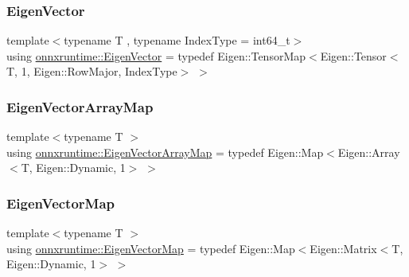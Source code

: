 \subsubsection{\texorpdfstring{Eigen\+Vector}{EigenVector}}
{\footnotesize\ttfamily template$<$typename T , typename Index\+Type  = int64\+\_\+t$>$ \\
using \mbox{\hyperlink{namespaceonnxruntime_a0f5d0e96b27a203da5065e22dfa6f28e}{onnxruntime\+::\+Eigen\+Vector}} = typedef Eigen\+::\+Tensor\+Map$<$Eigen\+::\+Tensor$<$T, 1, Eigen\+::\+Row\+Major, Index\+Type$>$ $>$}

\mbox{\label{namespaceonnxruntime_a6a153146e7fb11392789d4e7fbdfaac4}} 
\subsubsection{\texorpdfstring{Eigen\+Vector\+Array\+Map}{EigenVectorArrayMap}}
{\footnotesize\ttfamily template$<$typename T $>$ \\
using \mbox{\hyperlink{namespaceonnxruntime_a6a153146e7fb11392789d4e7fbdfaac4}{onnxruntime\+::\+Eigen\+Vector\+Array\+Map}} = typedef Eigen\+::\+Map$<$Eigen\+::\+Array$<$T, Eigen\+::\+Dynamic, 1$>$ $>$}

\mbox{\label{namespaceonnxruntime_ac267a13e3484233cf911a77bc106f099}} 
\subsubsection{\texorpdfstring{Eigen\+Vector\+Map}{EigenVectorMap}}
{\footnotesize\ttfamily template$<$typename T $>$ \\
using \mbox{\hyperlink{namespaceonnxruntime_ac267a13e3484233cf911a77bc106f099}{onnxruntime\+::\+Eigen\+Vector\+Map}} = typedef Eigen\+::\+Map$<$Eigen\+::\+Matrix$<$T, Eigen\+::\+Dynamic, 1$>$ $>$}

\mbox{\label{namespaceonnxruntime_a71ef3c4da6339a3625cdf4c4937e4913}} 
